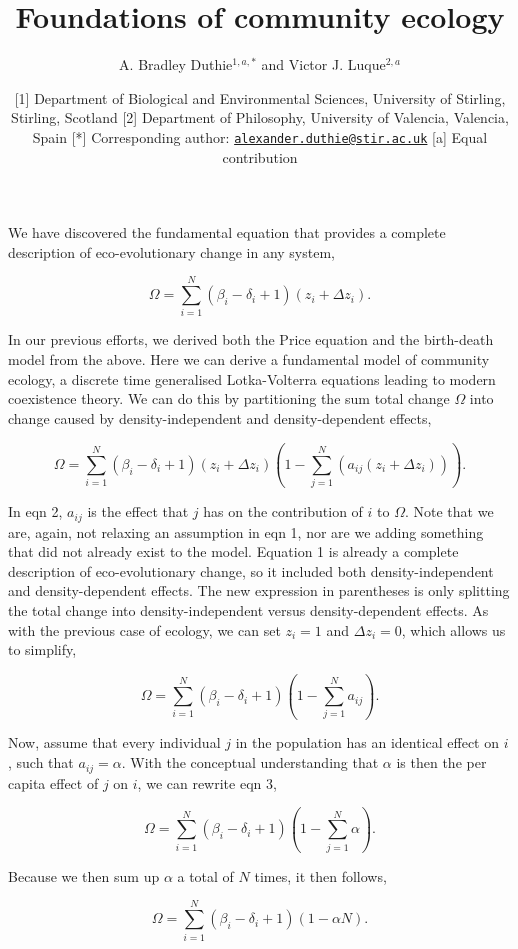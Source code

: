 \documentclass[
]{article}
\title{Foundations of community ecology}
\author{A. Bradley Duthie\(^{1,a,*}\) and Victor J. Luque\(^{2,a}\)}
\date{{[}1{]} Department of Biological and Environmental Sciences,
University of Stirling, Stirling, Scotland {[}2{]} Department of
Philosophy, University of Valencia, Valencia, Spain {[}*{]}
Corresponding author:
\href{mailto:alexander.duthie@stir.ac.uk}{\nolinkurl{alexander.duthie@stir.ac.uk}}
{[}a{]} Equal contribution}
\begin{document}
\maketitle

We have discovered the fundamental equation that provides a complete
description of eco-evolutionary change in any system,

\[\Omega = \sum_{i=1}^{N} \left(\beta_{i} - \delta_{i} + 1 \right)\left(z_{i} + \Delta z_{i} \right).
\tag{1}
\]

In our previous efforts, we derived both the Price equation and the
birth-death model from the above. Here we can derive a fundamental model
of community ecology, a discrete time generalised Lotka-Volterra
equations leading to modern coexistence theory. We can do this by
partitioning the sum total change \(\Omega\) into change caused by
density-independent and density-dependent effects,

\[\Omega = \sum_{i=1}^{N} \left(\beta_{i} - \delta_{i} + 1 \right)\left(z_{i} + \Delta z_{i} \right)\left(1 - \sum_{j = 1}^{N}\left(a_{ij}\left(z_{i} + \Delta z_{i} \right) \right) \right).
\tag{2}
\]

In eqn 2, \(a_{ij}\) is the effect that \(j\) has on the contribution of
\(i\) to \(\Omega\). Note that we are, again, not relaxing an assumption
in eqn 1, nor are we adding something that did not already exist to the
model. Equation 1 is already a complete description of eco-evolutionary
change, so it included both density-independent and density-dependent
effects. The new expression in parentheses is only splitting the total
change into density-independent versus density-dependent effects. As
with the previous case of ecology, we can set \(z_{i} = 1\) and
\(\Delta z_{i} = 0\), which allows us to simplify,

\[\Omega = \sum_{i=1}^{N} \left(\beta_{i} - \delta_{i} + 1 \right)\left(1 - \sum_{j = 1}^{N}a_{ij} \right).
\tag{3}
\]

Now, assume that every individual \(j\) in the population has an
identical effect on \(i\), such that \(a_{ij} = \alpha\). With the
conceptual understanding that \(\alpha\) is then the per capita effect
of \(j\) on \(i\), we can rewrite eqn 3,

\[\Omega = \sum_{i=1}^{N} \left(\beta_{i} - \delta_{i} + 1 \right)\left(1 - \sum_{j = 1}^{N}\alpha \right).
\]

Because we then sum up \(\alpha\) a total of \(N\) times, it then
follows,

\[\Omega = \sum_{i=1}^{N} \left(\beta_{i} - \delta_{i} + 1 \right)\left(1 - \alpha N \right).
\]
\end{document}
